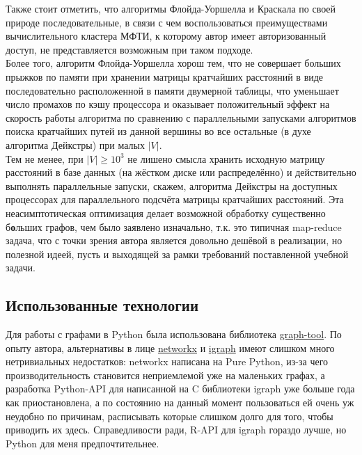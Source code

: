 \documentclass[11pt,a4paper]{report}
\def\ge{\geqslant}
\theoremstyle{definition}
\theoremstyle{definition}
\theoremstyle{definition}
\begin{document}
	\noindent Также стоит отметить, что алгоритмы Флойда-Уоршелла и Краскала по своей природе последовательные, в связи с чем воспользоваться преимуществами вычислительного кластера МФТИ, к которому автор имеет авторизованный доступ, не представляется возможным при таком подходе.\\
	
	\noindent Более того, алгоритм Флойда-Уоршелла хорош тем, что не совершает больших прыжков по памяти при хранении матрицы кратчайших расстояний в виде последовательно расположенной в памяти двумерной таблицы, что уменьшает число промахов по кэшу процессора и оказывает положительный эффект на скорость работы алгоритма по сравнению с параллельными запусками алгоритмов поиска кратчайших путей из данной вершины во все остальные (в духе алгоритма Дейкстры) при малых $|V|$.\\
	
	\noindent Тем не менее, при $|V| \ge 10^3$ не лишено смысла хранить исходную матрицу расстояний в базе данных (на жёстком диске или распределённо) и действительно выполнять параллельные запуски, скажем, алгоритма Дейкстры на доступных процессорах для параллельного подсчёта матрицы кратчайших расстояний. Эта неасимптотическая оптимизация делает возможной обработку существенно б\textbf{о}льших графов, чем было заявлено изначально, т.к. это типичная map-reduce задача, что с точки зрения автора является довольно дешёвой в реализации, но полезной идеей, пусть и выходящей за рамки требований поставленной учебной задачи. 
	
	\subsection{Использованные технологии}
			Для работы с графами в Python была использована библиотека \href{https://graph-tool.skewed.de/static/doc/topology.html#graph_tool.topology.shortest_distance}{graph-tool}. По опыту автора, альтернативы в лице \href{https://networkx.github.io/}{networkx} и \href{https://igraph.org/python/}{igraph} имеют слишком много нетривиальных недостатков: networkx написана на Pure Python, из-за чего производительность становится неприемлемой уже на маленьких графах, а разработка Python-API для написанной на C библиотеки igraph уже больше года как приостановлена, а по состоянию на данный момент пользоваться ей очень уж неудобно по причинам, расписывать которые слишком долго для того, чтобы приводить их здесь. Справедливости ради, R-API для igraph гораздо лучше, но Python для меня предпочтительнее.
\end{document}
